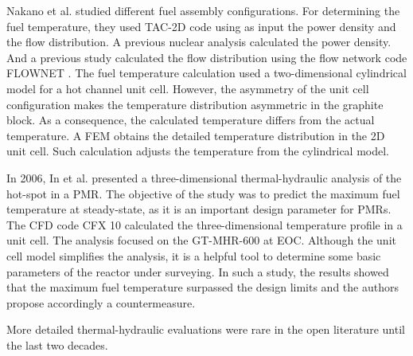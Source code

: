 \documentclass[11pt,letterpaper]{article}
\begin{document}
Nakano et al. \cite{nakano_conceptual_2008} studied different fuel assembly configurations.
For determining the fuel temperature, they used TAC-2D code \cite{peterson_tac2d_1969} using as input the power density and the flow distribution.
A previous nuclear analysis calculated the power density.
And a previous study calculated the flow distribution using the flow network code FLOWNET \cite{maruyama_verification_1988}.
The fuel temperature calculation used a two-dimensional cylindrical model for a hot channel unit cell.
However, the asymmetry of the unit cell configuration makes the temperature distribution asymmetric in the graphite block.
As a consequence, the calculated temperature differs from the actual temperature.
A \gls{FEM} obtains the detailed temperature distribution in the 2D unit cell.
Such calculation adjusts the temperature from the cylindrical model.

In 2006, In et al. \cite{in_three-dimensional_2006} presented a three-dimensional thermal-hydraulic analysis of the hot-spot in a \gls{PMR}.
The objective of the study was to predict the maximum fuel temperature at steady-state, as it is an important design parameter for \glspl{PMR}.
The CFD code CFX 10 \cite{ansys_inc_cfx_2006} calculated the three-dimensional temperature profile in a unit cell.
The analysis focused on the GT-MHR-600 at \gls{EOC}.
Although the unit cell model simplifies the analysis, it is a helpful tool to determine some basic parameters of the reactor under surveying.
In such a study, the results showed that the maximum fuel temperature surpassed the design limits and the authors propose accordingly a countermeasure.

More detailed thermal-hydraulic evaluations were rare in the open literature until the last two decades.
\end{document}

